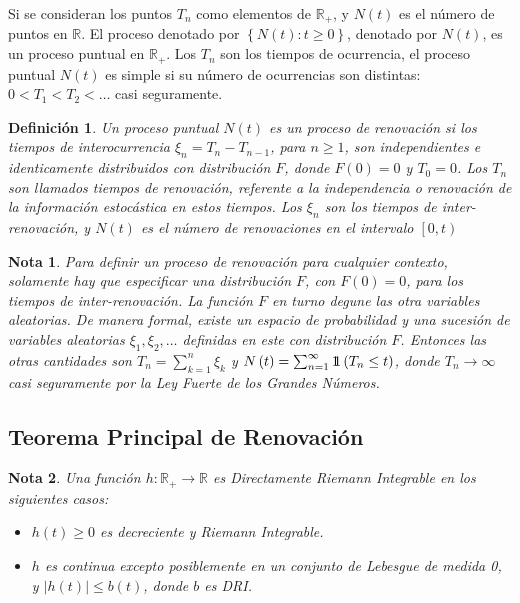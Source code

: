 \documentclass{article}
\newtheorem{Def}{Definición}
\newtheorem{Note}{Nota}
\newcommand{\rea}{\mathbb{R}}
\newcommand{\indora}{\mbox{$1$\hspace{-0.8ex}$1$}}
\begin{document}
Si se consideran los puntos $T_{n}$ como elementos de $\rea_{+}$, y $N\left(t\right)$ es el n\'umero de puntos en $\rea$. El proceso denotado por $\left\{N\left(t\right):t\geq0\right\}$, denotado por $N\left(t\right)$, es un proceso puntual en $\rea_{+}$. Los $T_{n}$ son los tiempos de ocurrencia, el proceso puntual $N\left(t\right)$ es simple si su n\'umero de ocurrencias son distintas: $0<T_{1}<T_{2}<\ldots$ casi seguramente.

\begin{Def}
Un proceso puntual $N\left(t\right)$ es un proceso de renovaci\'on si los tiempos de interocurrencia $\xi_{n}=T_{n}-T_{n-1}$, para $n\geq1$, son independientes e identicamente distribuidos con distribuci\'on $F$, donde $F\left(0\right)=0$ y $T_{0}=0$. Los $T_{n}$ son llamados tiempos de renovaci\'on, referente a la independencia o renovaci\'on de la informaci\'on estoc\'astica en estos tiempos. Los $\xi_{n}$ son los tiempos de inter-renovaci\'on, y $N\left(t\right)$ es el n\'umero de renovaciones en el intervalo $\left[0,t\right)$
\end{Def}


\begin{Note}
Para definir un proceso de renovaci\'on para cualquier contexto, solamente hay que especificar una distribuci\'on $F$, con $F\left(0\right)=0$, para los tiempos de inter-renovaci\'on. La funci\'on $F$ en turno degune las otra variables aleatorias. De manera formal, existe un espacio de probabilidad y una sucesi\'on de variables aleatorias $\xi_{1},\xi_{2},\ldots$ definidas en este con distribuci\'on $F$. Entonces las otras cantidades son $T_{n}=\sum_{k=1}^{n}\xi_{k}$ y $N\left(t\right)=\sum_{n=1}^{\infty}\indora\left(T_{n}\leq t\right)$, donde $T_{n}\rightarrow\infty$ casi seguramente por la Ley Fuerte de los Grandes Números.
\end{Note}

%
\subsection{Teorema Principal de Renovaci\'on}
%

\begin{Note} Una funci\'on $h:\rea_{+}\rightarrow\rea$ es Directamente Riemann Integrable en los siguientes casos:
\begin{itemize}
\item[a)] $h\left(t\right)\geq0$ es decreciente y Riemann Integrable.
\item[b)] $h$ es continua excepto posiblemente en un conjunto de Lebesgue de medida 0, y $|h\left(t\right)|\leq b\left(t\right)$, donde $b$ es DRI.
\end{itemize}
\end{Note}
\end{document}
